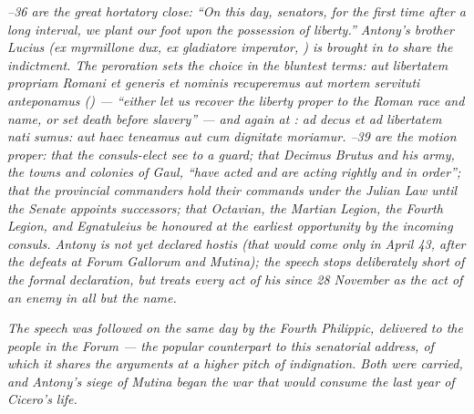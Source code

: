 \textit{--36 are the great hortatory close:
``On this day, senators, for the first time after a long
interval, we plant our foot upon the possession of liberty.''
Antony's brother Lucius (\textit{ex myrmillone dux, ex
gladiatore imperator}, ) is brought in to share
the indictment. The peroration sets the choice in the bluntest
terms: \textit{aut libertatem propriam Romani et generis et
nominis recuperemus aut mortem servituti anteponamus}
() --- ``either let us recover the liberty
proper to the Roman race and name, or set death before
slavery'' --- and again at : \textit{ad decus
et ad libertatem nati sumus: aut haec teneamus aut cum
dignitate moriamur}. --39 are the motion proper:
that the consuls-elect see to a guard; that Decimus Brutus and
his army, the towns and colonies of Gaul, ``have acted and are
acting rightly and in order''; that the provincial commanders
hold their commands under the Julian Law until the Senate
appoints successors; that Octavian, the Martian Legion, the
Fourth Legion, and Egnatuleius be honoured at the earliest
opportunity by the incoming consuls. Antony is not yet declared
\textit{hostis} (that would come only in April 43, after the
defeats at Forum Gallorum and Mutina); the speech stops
deliberately short of the formal declaration, but treats every
act of his since 28 November as the act of an enemy in all but
the name.}

\textit{The speech was followed on the same day by the Fourth
Philippic, delivered to the people in the Forum --- the popular
counterpart to this senatorial address, of which it shares the
arguments at a higher pitch of indignation. Both were carried,
and Antony's siege of Mutina began the war that would consume
the last year of Cicero's life.}
